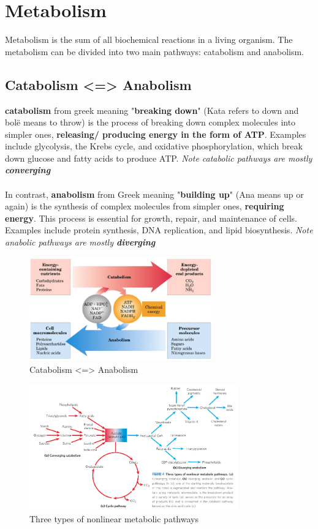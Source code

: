 \documentclass[../main.tex]{subfiles}
\begin{document}
\section{Metabolism}
Metabolism is the sum of all biochemical reactions in a living organism. The metabolism can be divided into two main pathways: catabolism and anabolism. 

\subsection{Catabolism <=> Anabolism}
\textbf{\gls{catabolism}} from greek meaning "\textbf{breaking down}" (Kata refers to down and bolë means to throw) is the process of breaking down complex molecules into simpler ones, \textbf{releasing/ producing energy in the form of ATP}. Examples include glycolysis, the Krebs cycle, and oxidative phosphorylation, which break down glucose and fatty acids to produce ATP. \textit{Note catabolic pathways are mostly \textbf{converging}} \\
\\
In contrast, \textbf{\gls{anabolism}} from Greek meaning "\textbf{building up}" (Ana means up or again) is the synthesis of complex molecules from simpler ones, \textbf{requiring energy}. This process is essential for growth, repair, and maintenance of cells. Examples include protein synthesis, DNA replication, and lipid biosynthesis. \textit{Note anabolic pathways are mostly \textbf{diverging}} 

\begin{figure}[H]
	\centering
	\includegraphics[width=0.7\textwidth]{cata_ana}
	\caption{Catabolism <=> Anabolism}
\end{figure}

\begin{figure}[H]
	\centering
	\includegraphics[width=0.8\textwidth]{pathways}
	\caption{Three types of nonlinear metabolic pathways}
\end{figure}
\end{document}
